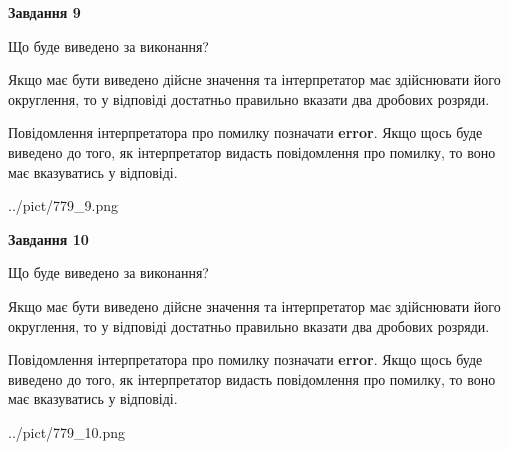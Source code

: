 \documentclass[12pt, ukrainian]{article}
\begin{document}
{\begin {Large}
{\begin {center}\textbf{Завдання 9}\end {center}}\par
Що буде виведено за виконання? \par

Якщо має бути виведено дійсне значення та інтерпретатор має здійснювати його округлення, 
то у відповіді достатньо правильно вказати два дробових розряди.

Повідомлення інтерпретатора про помилку позначати \textbf{error}.
Якщо щось буде виведено до того, як інтерпретатор видасть повідомлення про помилку, 
то воно має вказуватись у відповіді. \par

\begin{center}
	{../pict/779_9.png}
\end{center}
\newpage

{\begin {center}\textbf{Завдання 10}\end {center}}\par
Що буде виведено за виконання? \par

Якщо має бути виведено дійсне значення та інтерпретатор має здійснювати його округлення, 
то у відповіді достатньо правильно вказати два дробових розряди.

Повідомлення інтерпретатора про помилку позначати \textbf{error}.
Якщо щось буде виведено до того, як інтерпретатор видасть повідомлення про помилку, 
то воно має вказуватись у відповіді. \par

\begin{center}
	{../pict/779_10.png}
\end{center}
\newpage

\end {Large}}
\end{document}
